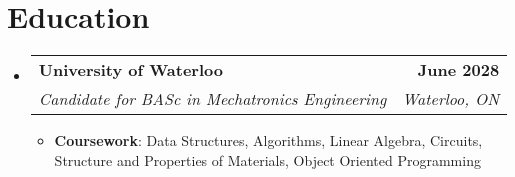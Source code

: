 \documentclass[letterpaper]{article}
\makeatletter
\newcommand{\resumeItem}[1]{
  \item\small{
    {#1 \vspace{-2pt}}
  }
}
\newcommand{\resumeSubheading}[4]{
  \vspace{-2pt}\item
    \begin{tabular*}{0.97\textwidth}[t]{l@{\extracolsep{\fill}}r}
      \textbf{#1} & #2 \\
      \textit{\small#3} & \textit{\small #4} \\
    \end{tabular*}\vspace{-7pt}
}
\newcommand{\resumeSubHeadingListStart}{\begin{itemize}[leftmargin=0.15in, label={}]}
\newcommand{\resumeSubHeadingListEnd}{\end{itemize}}
\newcommand{\resumeItemListStart}{\begin{itemize}}
\newcommand{\resumeItemListEnd}{\end{itemize}\vspace{-5pt}}
\makeatother
\begin{document}
\section{Education}
\resumeSubHeadingListStart
  \resumeSubheading
    {University of Waterloo}{\textbf{June 2028}}
    {Candidate for BASc in Mechatronics Engineering}{Waterloo, ON}
    \resumeItemListStart
      \resumeItem{\textbf{Coursework}: Data Structures, Algorithms, Linear Algebra, Circuits, Structure and Properties of Materials, Object Oriented Programming}
    \resumeItemListEnd
\resumeSubHeadingListEnd

\end{document}
